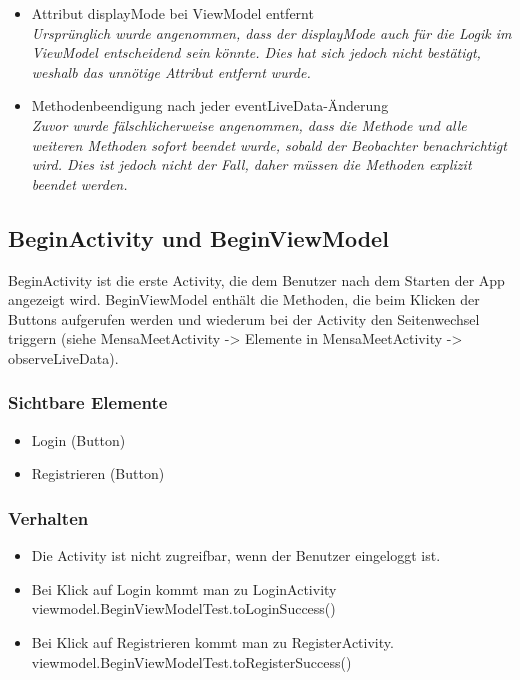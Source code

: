 \documentclass[a4paper]{scrreprt}
\begin{document}
\begin{itemize}
\item Attribut displayMode bei ViewModel entfernt\\
\textit{Ursprünglich wurde angenommen, dass der displayMode auch für die Logik im ViewModel entscheidend sein könnte. Dies hat sich jedoch nicht bestätigt, weshalb das unnötige Attribut entfernt wurde.}
\item Methodenbeendigung nach jeder eventLiveData-Änderung \\
\textit{Zuvor wurde fälschlicherweise angenommen, dass die Methode und alle weiteren Methoden sofort beendet wurde, sobald der Beobachter benachrichtigt wird. Dies ist jedoch nicht der Fall, daher müssen die Methoden explizit beendet werden.}
\end{itemize}

\subsection{BeginActivity und BeginViewModel}
BeginActivity ist die erste Activity, die dem Benutzer nach dem Starten der App angezeigt wird. BeginViewModel enthält die Methoden, die beim Klicken der Buttons aufgerufen werden und wiederum bei der Activity den Seitenwechsel triggern (siehe MensaMeetActivity -> Elemente in MensaMeetActivity -> observeLiveData). \\

\subsubsection{Sichtbare Elemente} 
\begin{itemize}
\item Login (Button)
\item Registrieren (Button) \\
\end{itemize}

\subsubsection{Verhalten} 
\begin{itemize}
\item Die Activity ist nicht zugreifbar, wenn der Benutzer eingeloggt ist. 
\item Bei Klick auf Login kommt man zu LoginActivity \\
viewmodel.BeginViewModelTest.toLoginSuccess()
\item Bei Klick auf Registrieren kommt man zu RegisterActivity. \\
viewmodel.BeginViewModelTest.toRegisterSuccess()
\end{itemize}
\end{document}

